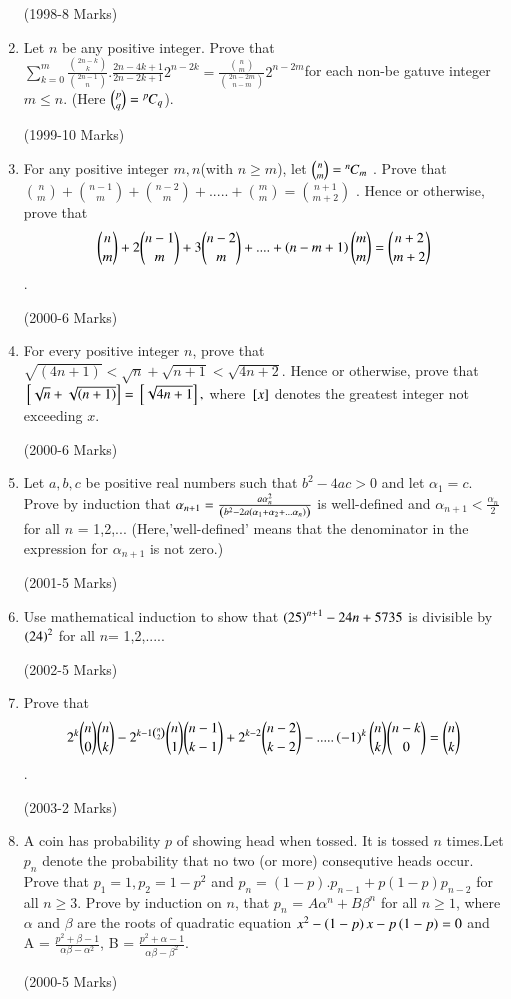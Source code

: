 \documentclass[journal,12pt,twocolumn]{IEEEtran}
\theoremstyle{remark}
\begin{document}
\begin{enumerate}[start=16]
		\hfill(1998-8 Marks)
\item 
	Let $n$ be any positive integer. Prove that $\sum\limits^{m}_{k=0}\frac{\binom{2n-k}{k}}{\binom{2n-1}{n}}.\frac{2n-4k+1}{2n-2k+1}2^{n-2k}= \frac{\binom{n}{m}}{\binom{2n-2m}{n-m}} 2^{n-2m}$for each non-be gatuve integer $m\leq n$. (Here $\binom{p}{q} = {{}^{p}\mkern-1muC_{q}}$).

		\hfill(1999-10 Marks)
\item
	For any positive integer $m,n$(with $n \geq m$), let $\binom{n}{m} ={{}^{n}\mkern-1muC_{m}}$ . Prove that $\binom{n}{m} + \binom{n-1}{m} + \binom{n-2}{m} + ..... + \binom{m}{m} = \binom{n+1}{m+2}$ . Hence or otherwise, prove that 
\begin{align}
\binom{n}{m} +2\binom{n-1}{m} +3\binom{n-2}{m}+....+ \left(n-m+1\right) \binom{m}{m} = \binom{n+2}{m+2}
\end{align}.

		\hfill(2000-6 Marks)
\item
	For every positive integer $n$, prove that $\sqrt{(4n+1)} < \sqrt{n} +\sqrt{n+1} < \sqrt{4n+2}$. Hence or otherwise, prove that ${}\left[\sqrt{n} + \sqrt{\left(n+1\right)}\right]= {}\left[\sqrt{4n+1}\right],$ where ${}\left[x\right]$ denotes the greatest integer not exceeding $x$.

		\hfill(2000-6 Marks)
\item
Let $a,b,c$ be positive real numbers such that $b^2 - 4ac > 0$ and let $\alpha_1 = c$. Prove by induction that $\alpha_{n+1} = \frac{a\alpha_{n}^2}{\left(b^2 - 2a \left(\alpha_1 + \alpha_2 + ... \alpha_n\right)\right)}$ is well-defined and $\alpha_{n+1} < \frac{\alpha_n}{2}$ for all $n$ = 1,2,...
		(Here,'well-defined' means that the denominator in the expression for $\alpha_{n+1}$ is not zero.)

		\hfill(2001-5 Marks)
\item
Use mathematical induction to show that $\left(25\right)^{n+1} - 24 n + 5735$ is divisible by $\left(24\right)^2$ for all $n$= 1,2,.....

		\hfill(2002-5 Marks)
\item 
Prove that
\begin{align}
2^k \binom{n}{0}\binom{n}{k} - 2^{k-1\binom{n}{2}} \binom{n}{1} \binom{n-1}{k-1} + 2^{k-2}\binom{n-2}{k-2} - .....\left(-1\right)^k \binom{n}{k}\binom{n-k}{0} = \binom{n}{k}
\end{align}.

		\hfill(2003-2 Marks)
\item
A coin has probability $p$ of showing head when tossed. It is tossed $n$ times.Let $p_n$ denote the probability that no two (or more) consequtive heads occur. Prove that $p_1=1 , p_2=1-p^2$ and $p_n = (1-p).p_{n-1} + p(1-p)p_{n-2}$ for all $ n \geq 3 $. Prove by induction on $n$, that $p_n$ = $A\alpha^n + B\beta^n$ for all $n \geq 1$, where $\alpha$ and $\beta$ are the roots of quadratic equation $x^2 - \left(1-p\right)x - p\left(1-p\right) = 0$ and A = $\frac{p^2 + \beta -1}{\alpha\beta-\alpha^2}$, B = $\frac{p^2 + \alpha -1}{\alpha\beta - \beta^2}$.

		\hfill(2000-5 Marks)



\end{enumerate}
\end{document}
